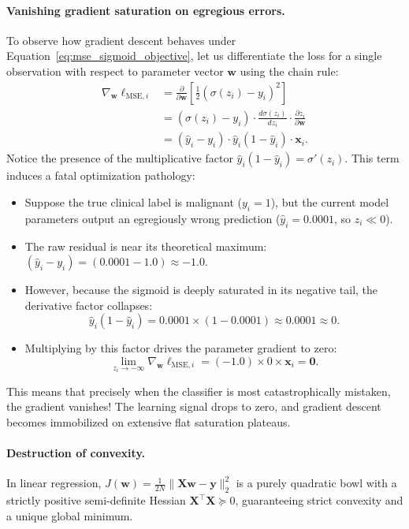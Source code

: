 \paragraph{Vanishing gradient saturation on egregious errors.}
To observe how gradient descent behaves under Equation~\eqref{eq:mse_sigmoid_objective}, let us differentiate the loss for a single observation with respect to parameter vector $\mathbf{w}$ using the chain rule:
\begin{align}
\nabla_{\mathbf{w}} \ell_{\text{MSE}, i} &= \frac{\partial}{\partial \mathbf{w}} \left[ \frac{1}{2} (\sigma(z_i) - y_i)^2 \right] \nonumber \\
&= (\sigma(z_i) - y_i) \cdot \frac{d\sigma(z_i)}{dz_i} \cdot \frac{\partial z_i}{\partial \mathbf{w}} \nonumber \\
&= (\hat{y}_i - y_i) \cdot \hat{y}_i(1 - \hat{y}_i) \cdot \mathbf{x}_i.
\label{eq:mse_sigmoid_gradient}
\end{align}
Notice the presence of the multiplicative factor $\hat{y}_i(1 - \hat{y}_i) = \sigma'(z_i)$. This term induces a fatal optimization pathology:
\begin{itemize}[noitemsep]
  \item Suppose the true clinical label is malignant ($y_i = 1$), but the current model parameters output an egregiously wrong prediction ($\hat{y}_i = 0.0001$, so $z_i \ll 0$).
  \item The raw residual is near its theoretical maximum: $(\hat{y}_i - y_i) = (0.0001 - 1.0) \approx -1.0$.
  \item However, because the sigmoid is deeply saturated in its negative tail, the derivative factor collapses:
  \begin{equation}
  \hat{y}_i(1 - \hat{y}_i) = 0.0001 \times (1 - 0.0001) \approx 0.0001 \approx 0.
  \end{equation}
  \item Multiplying by this factor drives the parameter gradient to zero:
  \begin{equation}
  \lim_{z_i \to -\infty} \nabla_{\mathbf{w}} \ell_{\text{MSE}, i} = (-1.0) \times 0 \times \mathbf{x}_i = \mathbf{0}.
  \end{equation}
\end{itemize}
This means that precisely when the classifier is most catastrophically mistaken, the gradient vanishes! The learning signal drops to zero, and gradient descent becomes immobilized on extensive flat saturation plateaus.

\paragraph{Destruction of convexity.}
In linear regression, $J(\mathbf{w}) = \frac{1}{2N}\|\mathbf{X}\mathbf{w} - \mathbf{y}\|_2^2$ is a purely quadratic bowl with a strictly positive semi-definite Hessian $\mathbf{X}^\top \mathbf{X} \succeq 0$, guaranteeing strict convexity and a unique global minimum. 

